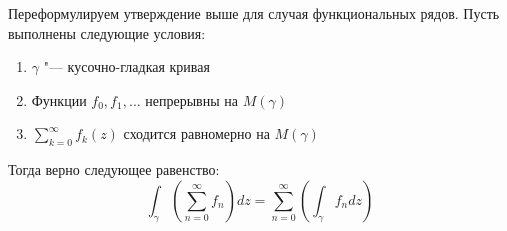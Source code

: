 \begin{note}
	Переформулируем утверждение выше для случая функциональных рядов. Пусть выполнены следующие условия:
	\begin{enumerate}
		\item $\gamma$ "--- кусочно-гладкая кривая
		\item Функции $f_0, f_1, \dotsc$ непрерывны на $M(\gamma)$ 
		\item $ \sum\limits_{k=0}^{\infty}f_k(z)$ сходится равномерно на $M(\gamma)$ 
	\end{enumerate}
	
	Тогда верно следующее равенство:
	\[\int_\gamma \left(\sum\limits_{n=0}^\infty f_n\right)dz = \sum\limits_{n=0}^\infty \left(\int_\gamma f_ndz\right)\]
\end{note}
